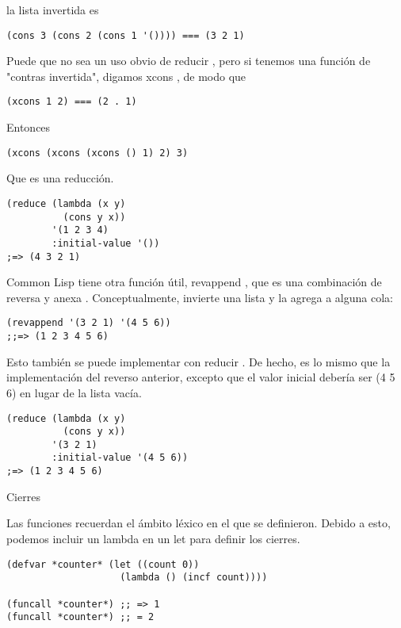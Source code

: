 \documentclass[11pt]{article}
\begin{document}
\begin{itemize}
la lista invertida es

\begin{verbatim}
(cons 3 (cons 2 (cons 1 '()))) === (3 2 1)
\end{verbatim}

Puede que no sea un uso obvio de reducir , pero si tenemos una función
de "contras invertida", digamos xcons , de modo que

\begin{verbatim}
(xcons 1 2) === (2 . 1)
\end{verbatim}

Entonces

\begin{verbatim}
(xcons (xcons (xcons () 1) 2) 3)
\end{verbatim}

Que es una reducción.

\begin{verbatim}
(reduce (lambda (x y)
          (cons y x))
        '(1 2 3 4)
        :initial-value '())
;=> (4 3 2 1)
\end{verbatim}


Common Lisp tiene otra función útil, revappend , que es una
combinación de reversa y anexa . Conceptualmente, invierte una lista y
la agrega a alguna cola:

\begin{verbatim}
(revappend '(3 2 1) '(4 5 6))
;;=> (1 2 3 4 5 6)

\end{verbatim}

Esto también se puede implementar con reducir . De hecho, es lo mismo
que la implementación del reverso anterior, excepto que el valor
inicial debería ser (4 5 6) en lugar de la lista vacía.

\begin{verbatim}
(reduce (lambda (x y)
          (cons y x))
        '(3 2 1)
        :initial-value '(4 5 6))
;=> (1 2 3 4 5 6)
\end{verbatim}

Cierres

Las funciones recuerdan el ámbito léxico en el que se
definieron. Debido a esto, podemos incluir un lambda en un let para
definir los cierres.

\begin{verbatim}
(defvar *counter* (let ((count 0))
                    (lambda () (incf count))))

(funcall *counter*) ;; => 1
(funcall *counter*) ;; = 2


\end{verbatim}
\end{itemize}
\end{document}
